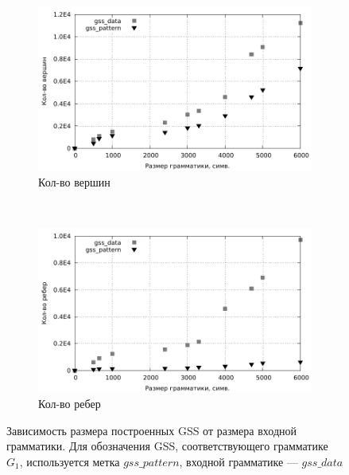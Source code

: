 \begin{figure}[h]
	\centering
	\begin{subfigure}[b]{0.45\textwidth}
		\centering
		\includegraphics[width=\textwidth]{../diploma/pictures/gss.pdf}
		\caption{Кол-во вершин}
	\end{subfigure}
	~
	\begin{subfigure}[b]{0.45\textwidth}
		\centering
		\includegraphics[width=\textwidth]{../diploma/pictures/gss_edge.pdf}
		\caption{Кол-во ребер}
	\end{subfigure}
	\caption{Зависимость размера построенных GSS от размера входной грамматики. Для обозначения GSS, соответствующего грамматике $G_1$, используется метка $gss\_pattern$, входной грамматике --- $gss\_data$}
	\label{gss}
\end{figure}

\pagebreak